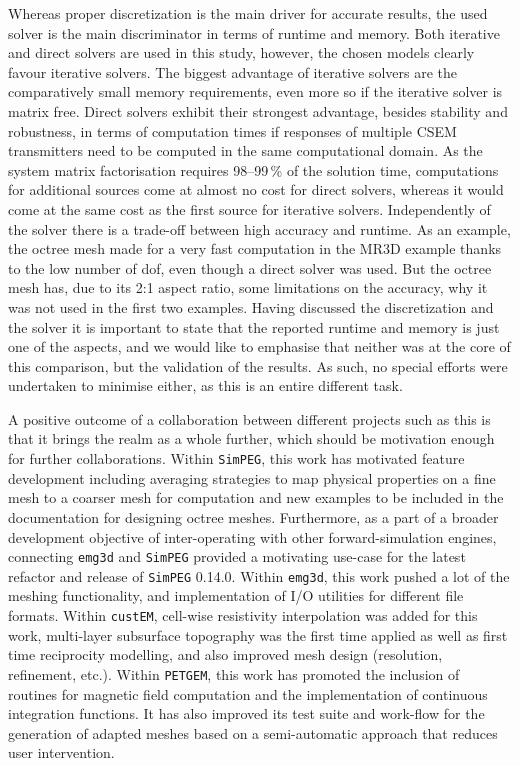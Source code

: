 \documentclass[
    paper,
  ]{geophysics}
\newcommand{\emg}[2]{\texttt{emg#1#2}\xspace}
\newcommand{\simpeg}{\texttt{SimPEG}\xspace}
\newcommand{\custem}{\texttt{custEM}\xspace}
\newcommand{\petgem}{\texttt{PETGEM}\xspace}
\begin{document}
Whereas proper discretization is the main driver for accurate results, the used solver is the main discriminator in terms of runtime and memory. Both iterative and direct solvers are used in this study, however, the chosen models clearly favour iterative solvers. The biggest advantage of iterative solvers are the comparatively small memory requirements, even more so if the iterative solver is matrix free. Direct solvers exhibit their strongest advantage, besides stability and robustness, in terms of computation times if responses of multiple CSEM transmitters need to be computed in the same computational domain. As the system matrix factorisation requires 98--99\,\% of the solution time, computations for additional sources come at almost no cost for direct solvers, whereas it would come at the same cost as the first source for iterative solvers. Independently of the solver there is a trade-off between high accuracy and runtime. As an example, the octree mesh made for a very fast computation in the MR3D example thanks to the low number of dof, even though a direct solver was used. But the octree mesh has, due to its 2:1 aspect ratio, some limitations on the accuracy, why it was not used in the first two examples. Having discussed the discretization and the solver it is important to state that the reported runtime and memory is just one of the aspects, and we would like to emphasise that neither was at the core of this comparison, but the validation of the results. As such, no special efforts were undertaken to minimise either, as this is an entire different task.

A positive outcome of a collaboration between different projects such as this is that it brings the realm as a whole further, which should be motivation enough for further collaborations. Within \simpeg, this work has motivated feature development including averaging strategies to map physical properties on a fine mesh to a coarser mesh for computation and new examples to be included in the documentation for designing octree meshes. Furthermore, as a part of a broader development objective of inter-operating with other forward-simulation engines, connecting \emg3d and \simpeg provided a motivating use-case for the latest refactor and release of \simpeg 0.14.0. Within \emg3d, this work pushed a lot of the meshing functionality, and implementation of I/O utilities for different file formats. Within \custem, cell-wise resistivity interpolation was added for this work, multi-layer subsurface topography was the first time applied as well as first time reciprocity modelling, and also improved mesh design (resolution, refinement, etc.). Within \petgem, this work has promoted the inclusion of routines for magnetic field computation and the implementation of continuous integration functions. It has also improved its test suite and work-flow for the generation of adapted meshes based on a semi-automatic approach that reduces user intervention.
\end{document}
